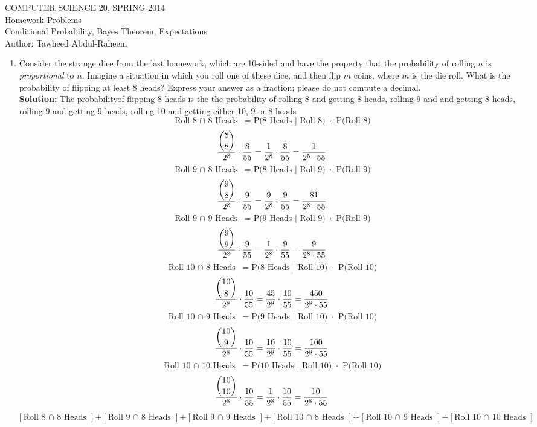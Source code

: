 \documentclass[12pt]{article}
\begin{document}
\begin{center}
COMPUTER SCIENCE 20, SPRING 2014 \\
Homework Problems\\
Conditional Probability, Bayes Theorem, Expectations \\
Author: Tawheed Abdul-Raheem
\end{center}

\smallskip

\begin{enumerate}
\item Consider the strange dice from the last homework, which are 10-sided and have the property that the probability of rolling $n$ is \emph{proportional} to $n$. Imagine a situation in which you roll one of these dice, and then flip $m$ coins, where $m$ is the die roll. What is the probability of flipping at least 8 heads? Express your answer as a fraction; please do not compute a decimal. \\
  \textbf{Solution: } The probabilityof flipping 8 heads is the the probability of rolling 8 and getting 8 heads, rolling 9 and and getting 8 heads, rolling 9 and getting 9 heads, rolling 10 and getting either 10, 9 or 8 heads
  \[\text{Roll 8 $\cap$ 8 Heads } = \text{P(8 Heads $|$ Roll 8) $\cdot$ P(Roll 8)} \]
  \[\frac{\dbinom{8}{8}}{2^{8}} \cdot \frac{8}{55} = \frac{1}{2^{8}} \cdot \frac{8}{55} = \frac{1}{2^{5} \cdot 55} \]
  \[\text{Roll 9 $\cap$ 8 Heads } = \text{P(8 Heads $|$ Roll 9) $\cdot$ P(Roll 9)} \]
  \[\frac{\dbinom{9}{8}}{2^{8}} \cdot \frac{9}{55} = \frac{9}{2^{8}} \cdot \frac{9}{55} = \frac{81}{2^{8} \cdot 55} \]
  \[\text{Roll 9 $\cap$ 9 Heads } = \text{P(9 Heads $|$ Roll 9) $\cdot$ P(Roll 9)} \]
  \[\frac{\dbinom{9}{9}}{2^{8}} \cdot \frac{9}{55} = \frac{1}{2^{8}} \cdot \frac{9}{55} = \frac{9}{2^{8} \cdot 55} \]
  \[\text{Roll 10 $\cap$ 8 Heads } = \text{P(8 Heads $|$ Roll 10) $\cdot$ P(Roll 10)} \]
  \[\frac{\dbinom{10}{8}}{2^{8}} \cdot \frac{10}{55} = \frac{45}{2^{8}} \cdot \frac{10}{55} = \frac{450}{2^{8} \cdot 55} \]
  \[\text{Roll 10 $\cap$ 9 Heads } = \text{P(9 Heads $|$ Roll 10) $\cdot$ P(Roll 10)} \]
  \[\frac{\dbinom{10}{9}}{2^{8}} \cdot \frac{10}{55} = \frac{10}{2^{8}} \cdot \frac{10}{55} = \frac{100}{2^{8} \cdot 55} \]
  \[\text{Roll 10 $\cap$ 10 Heads } = \text{P(10 Heads $|$ Roll 10) $\cdot$ P(Roll 10)} \]
  \[\frac{\dbinom{10}{10}}{2^{8}} \cdot \frac{10}{55} = \frac{1}{2^{8}} \cdot \frac{10}{55} = \frac{10}{2^{8} \cdot 55} \]
  $\big[\text{Roll 8 $\cap$ 8 Heads } \big] + \big[\text{Roll 9 $\cap$ 8 Heads } \big] +\big[\text{Roll 9 $\cap$ 9 Heads } \big] +\big[\text{Roll 10 $\cap$ 8 Heads } \big] +\big[\text{Roll 10 $\cap$ 9 Heads } \big] +\big[\text{Roll 10 $\cap$ 10 Heads } \big]$


\end{enumerate}
\end{document}
